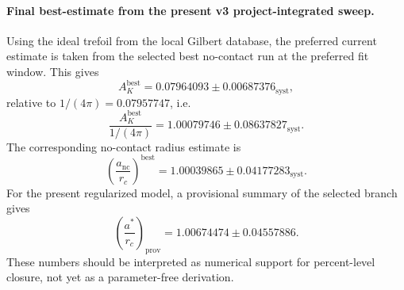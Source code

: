 \paragraph{Final best-estimate from the present v3 project-integrated sweep.}
Using the ideal trefoil from the local Gilbert database, the preferred current estimate is taken from the selected best no-contact run at the preferred fit window. This gives
\[
A_K^{\mathrm{best}} = 0.07964093 \pm 0.00687376_{\mathrm{syst}},
\]
relative to $1/(4\pi)=0.07957747$, i.e.
\[
\frac{A_K^{\mathrm{best}}}{1/(4\pi)} = 1.00079746 \pm 0.08637827_{\mathrm{syst}}.
\]
The corresponding no-contact radius estimate is
\[
\left(\frac{a_{\mathrm{nc}}}{r_c}\right)^{\mathrm{best}} = 1.00039865 \pm 0.04177283_{\mathrm{syst}}.
\]
For the present regularized model, a provisional summary of the selected branch gives
\[
\left(\frac{a^*}{r_c}\right)_{\mathrm{prov}} = 1.00674474 \pm 0.04557886.
\]
These numbers should be interpreted as numerical support for percent-level closure, not yet as a parameter-free derivation.
